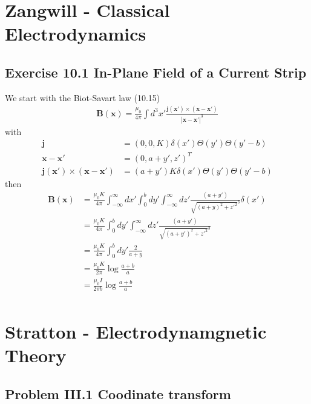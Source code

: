 \documentclass[../main.tex]{subfiles}
\begin{document}
\section{{\sc Zangwill} - Classical Electrodynamics}
\subsection{Exercise 10.1 In-Plane Field of a Current Strip}
We start with the Biot-Savart law (10.15)
\begin{align}
\mathbf{B}(\mathbf{x})=\frac{\mu_0}{4\pi}\int d^3x'\frac{\mathbf{j}(\mathbf{x}')\times(\mathbf{x}-\mathbf{x}')}{|\mathbf{x}-\mathbf{x}'|^3}
\end{align}
with
\begin{align}
\mathbf{j}&=(0,0,K)\delta(x')\Theta(y')\Theta(y'-b)\\
\mathbf{x}-\mathbf{x}'&=(0,a+y',z')^T\\
\mathbf{j}(\mathbf{x}')\times(\mathbf{x}-\mathbf{x}')&=(a+y')K\delta(x')\Theta(y')\Theta(y'-b)
\end{align}
then
\begin{align}
\mathbf{B}(\mathbf{x})
&=\frac{\mu_0K}{4\pi}\int_{-\infty}^\infty dx'\int_0^b dy'\int_{-\infty}^\infty dz'\frac{(a+y')}{\sqrt{(a+y)^2+z'^2}^3}\delta(x')\\
&=\frac{\mu_0K}{4\pi}\int_0^b dy'\int_{-\infty}^\infty dz'\frac{(a+y')}{\sqrt{(a+y')^2+z'^2}^3}\\
&=\frac{\mu_0K}{4\pi}\int_0^b dy'\frac{2}{a+y}\\
&=\frac{\mu_0K}{2\pi}\log\frac{a+b}{a}\\
&=\frac{\mu_0I}{2\pi b}\log\frac{a+b}{a}\\
\end{align}


\section{{\sc Stratton} - Electrodynamgnetic Theory}
\subsection{Problem III.1 Coodinate transform}
\end{document}
